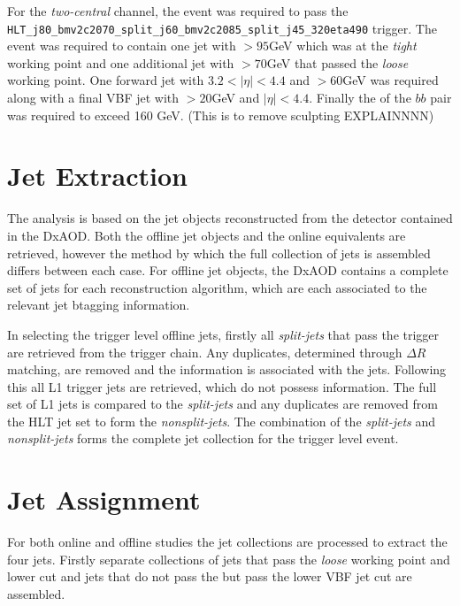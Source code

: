 		For the \textit{two-central} channel, the event was required to pass the \verb|HLT_j80_bmv2c2070_split_j60_bmv2c2085_split_j45_320eta490| trigger. The event was required to contain one jet with \pt$>95$GeV which was \btagged at the \textit{tight} working point and one additional jet with \pt$>70$GeV that passed the \textit{loose} \btag working point. One forward jet with $3.2 < |\eta| < 4.4$ and \pt$>60$GeV was required along with a final VBF jet with \pt$>20$GeV and $|\eta| < 4.4$. Finally the \pt of the $bb$ pair was required to exceed 160 GeV. (This is to remove sculpting EXPLAINNNN)
		
	\section{Jet Extraction}
	
		The analysis is based on the jet objects reconstructed from the detector contained in the DxAOD. Both the offline jet objects and the online equivalents are retrieved, however the method by which the full collection of jets is assembled differs between each case. For offline jet objects, the DxAOD contains a complete set of jets for each reconstruction algorithm, which are each associated to the relevant jet btagging information. 
		
		In selecting the trigger level offline jets, firstly all \textit{split-jets} that pass the trigger are retrieved from the trigger chain. Any duplicates, determined through $\Delta R$ matching, are removed and the \btag information is associated with the jets. Following this all L1 trigger jets are retrieved, which do not possess \btag information. The full set of L1 jets is compared to the \textit{split-jets} and any duplicates are removed from the HLT jet set to form the \textit{nonsplit-jets}. The combination of the \textit{split-jets} and \textit{nonsplit-jets} forms the complete jet collection for the trigger level event.
		
	\section{Jet Assignment}
	
		For both online and offline studies the jet collections are processed to extract the four \VBFHBB jets. Firstly separate collections of jets that pass the \textit{loose} \btag working point and lower \bjet \pt cut and jets that do not pass the \btag but pass the lower VBF jet cut are assembled. 
	

